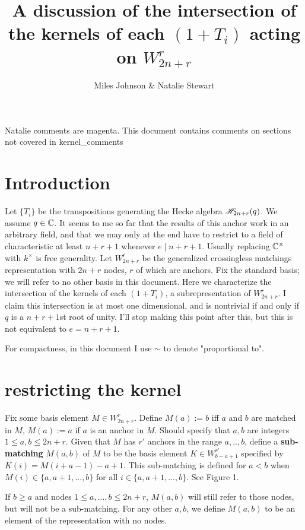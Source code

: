 \documentclass{amsart}
\begin{document}
	
\title{A discussion of the intersection of the kernels of each $(1+T_i)$ acting on $W_{2n+r}^r$}
\author{Miles Johnson \& Natalie Stewart}

\maketitle

{\color{magenta} Natalie comments are magenta. This document contains comments on sections not covered in kernel\_comments}

\section{Introduction} 

Let $\{T_i\}$ be the transpositions generating the Hecke algebra $\mathscr{H}_{2n+r}(q)$. We assume $q\in \mathbb{C}$.
{\color{magenta} It seems to me so far that the results of this anchor work in an arbitrary field, and that we may only at the end have to restrict to a field of characteristic at least $n + r + 1$ whenever $e \mid n + r + 1$.
Usually replacing $\mathbb{C}^\times$ with $k^\times$ is free generality.
}
Let $W_{2n+r}^r$ be the generalized crossingless matchings representation with $2n+r$ nodes, $r$ of which are anchors. Fix the standard basis; we will refer to no other basis in this document. Here we characterize the intersection of the kernels of each $(1+T_i)$, a subrepresentation of $W_{2n+r}^r$. I claim this intersection is at most one dimensional, and is nontrivial if and only if $q$ is a $n+r+1$st root of unity.
{\color{magenta} I'll stop making this point after this, but this is not equivalent to $e = n + r + 1$.}

For compactness, in this document I use $\sim $ to denote "proportional to".

 \section{restricting the kernel}


\begin{definition}
	
  Fix some basis element $M\in W_{2n+r}^r$. Define $M(a):=b$ iff $a$ and $b$ are matched in $M$, $M(a):=a$ if $a$ is an anchor in $M$.
  {\color{magenta} Should specify that $a,b$ are integers $1 \leq a,b \leq 2n + r$.} 
  Given that $M$ has $r'$ anchors in the range $a,..,b$, define a \textbf{sub-matching} $M(a,b)$ of $M$ to be the basis element $K\in W_{b-a+1}^{r'}$ specified by $K(i)=M(i+a-1)-a+1$. This sub-matching is defined for $a<b$ when $M(i)\in \{a,a+1,...,b\}$ for all $i\in \{a,a+1,...,b\}$. See Figure 1.
  
  If $b\geq a$ and nodes $1\leq a,...,b\leq 2n+r$, $M(a,b)$ will still refer to those nodes, but will not be a sub-matching. For any other $a,b$, we define $M(a,b)$ to be an element of the representation with no nodes.
\end{definition}
\end{document}

